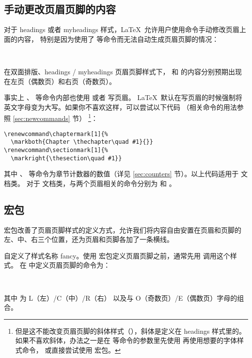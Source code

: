 \subsection{手动更改页眉页脚的内容}\label{subsec:marks}

对于 headings 或者 myheadings 样式，\LaTeX\ 允许用户使用命令手动修改页眉上面的内容，
特别是因为使用了  等命令而无法自动生成页眉页脚的情况：
\begin{command}
\\
\end{command}

在双面排版、headings / myheadings 页眉页脚样式下， 和  的内容分别预期出现在左页（偶数页）和右页（奇数页）。

事实上 、 等命令内部也使用  或者  写页眉。
\LaTeX\ 默认在写页眉的时候强制将英文字母变为大写。如果你不喜欢这样，可以尝试以下代码
（相关命令的用法参照 \ref{sec:newcommands} 节）%
\footnote{但是这不能改变页眉页脚的斜体样式（），斜体是定义在 headings 样式里的。
如果不喜欢斜体，办法之一是在  等命令的参数里先使用  再使用想要的字体样式命令，
或直接尝试使用  宏包。}：
\begin{verbatim}
\renewcommand\chaptermark[1]{%
  \markboth{Chapter \thechapter\quad #1}{}}
\renewcommand\sectionmark[1]{%
  \markright{\thesection\quad #1}}
\end{verbatim}

其中 、 等命令为章节计数器的数值（详见 \ref{sec:counters} 节）。以上代码适用于  文档类。
对于  文档类，与两个页眉相关的命令分别为  和  。

\subsection{ 宏包}\label{subsec:fancyhdr}

 宏包改善了页眉页脚样式的定义方式，允许我们将内容自由安置在页眉和页脚的左、中、右三个位置，还为页眉和页脚各加了一条横线。

 自定义了样式名称 fancy。使用  宏包定义页眉页脚之前，通常先用  调用这个样式。
在  中定义页眉页脚的命令为：
\begin{command}
\marg*{\ldots}\\
\marg*{\ldots}
\end{command}
其中  为 L（左）/C（中）/R（右） 以及与 O（奇数页）/E（偶数页）字母的组合。

